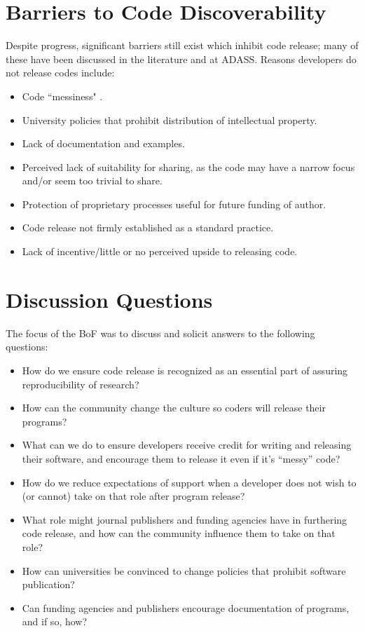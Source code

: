 \documentclass[11pt,twoside]{article}
\begin{document}
\section{Barriers to Code Discoverability}

Despite progress, significant barriers still exist which inhibit code release; many of these have been discussed in the literature and at ADASS. Reasons developers do not release codes include:

\begin{itemize}
\item Code ``messiness" \citep{barnes2010}.
\item University policies that prohibit distribution of intellectual property.
\item Lack of documentation and examples.
\item Perceived lack of suitability for sharing, as the code may have a narrow focus and/or seem too trivial to share.
\item Protection of proprietary processes useful for future funding of author.
\item Code release not firmly established as a standard practice.
\item Lack of incentive/little or no perceived upside to releasing code.
\end{itemize}

\section{Discussion Questions}

The focus of the BoF was to discuss and solicit answers to the following questions:

\begin{itemize}
\item How do we ensure code release is recognized as an essential part of assuring reproducibility of research?
\item How can the community change the culture so coders will release their programs?
\item What can we do to ensure developers receive credit for writing and releasing their software, and encourage them to release it even if it's ``messy'' code?
\item How do we reduce expectations of support when a developer does not wish to (or cannot) take on that role after program release?
\item What role might journal publishers and funding agencies have in furthering code release, and how can the community influence them to take on that role?
\item How can universities be convinced to change policies that prohibit software publication?
\item Can funding agencies and publishers encourage documentation of programs, and if so, how?
\end{itemize}
\end{document}
